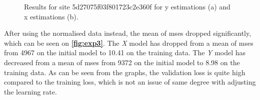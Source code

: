 \begin{figure}[H]
\centering
  \hfill
  \caption{Results for site 5d27075f03f801723c2e360f for y estimations (a) and x estimations (b).}
  \label{fig:exp3}
\end{figure}

After using the normalised data instead, the mean of \gls{mse}s dropped significantly, which can be seen on \textbf{\autoref{fig:exp3}}. The \textit{X} model has dropped from a mean of \gls{mse}s from 4967 on the initial model to 10.41 on the training data. The \textit{Y} model has decreased from a mean of \gls{mse}s from 9372 on the initial model to 8.98 on the training data. As can be seen from the graphs, the validation loss is quite high compared to the training loss, which is not an issue of same degree with adjusting the learning rate.

